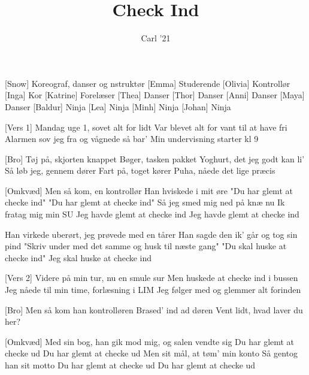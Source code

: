 \documentclass[a4paper,11pt]{article}
\title{Check Ind}
\author{Carl '21}
\begin{document}
\maketitle

\begin{roles}
[Snow] Koreograf, danser og nstruktør
[Emma] Studerende
[Olivia] Kontrollør
[Inga] Kor
[Katrine] Forelæser
[Thea] Danser
[Thor] Danser
[Anni] Danser
[Maya] Danser
[Baldur] Ninja
[Lea] Ninja
[Minh] Ninja
[Johan] Ninja
\end{roles}

\begin{song}

[Vers 1] Mandag uge 1, sovet alt for lidt
    Var blevet alt for vant til at have fri
    Alarmen sov jeg fra og vågnede så bar'
    Min undervisning starter kl 9

[Bro] Tøj på, skjorten knappet
    Bøger, tasken pakket
    Yoghurt, det jeg godt kan li'
    Så løb jeg, gennem dører
    Fart på, toget kører
    Puha, nåede det lige præcis

[Omkvæd] Men så kom, en kontrollør
    Han hviskede i mit øre
    "Du har glemt at checke ind"
    "Du har glemt at checke ind"
    Så jeg smed mig ned på knæ nu
    Ik fratag mig min SU
    Jeg havde glemt at checke ind
    Jeg havde glemt at checke ind

    Han virkede uberørt, jeg prøvede med en tårer
    Han sagde den ik' går og tog sin pind
    "Skriv under med det samme og husk til næste gang"
    "Du skal huske at checke ind"
    Jeg skal huske at checke ind


[Vers 2] Videre på min tur, nu en smule sur
    Men huskede at checke ind i bussen
    Jeg nåede til min time, forlæsning i LIM
    Jeg følger med og glemmer alt forinden

[Bro] Men så kom han kontrolløren
    Brased' ind ad døren
    Vent lidt, hvad laver du her?

[Omkvæd] Med sin bog, han gik mod mig, og salen vendte sig
 Du har glemt at checke ud
    Du har glemt at checke ud
 Men sit mål, at tøm' min konto
    Så gentog han sit motto
 Du har glemt at checke ud
    Du har glemt at checke ud


\end{song}
\end{document}
